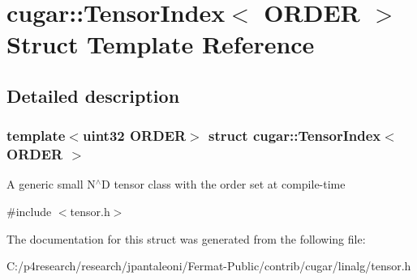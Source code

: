 \hypertarget{structcugar_1_1_tensor_index}{}\section{cugar\+:\+:Tensor\+Index$<$ O\+R\+D\+ER $>$ Struct Template Reference}
\label{structcugar_1_1_tensor_index}


\subsection{Detailed description}
\subsubsection*{template$<$uint32 O\+R\+D\+ER$>$\newline
struct cugar\+::\+Tensor\+Index$<$ O\+R\+D\+E\+R $>$}

A generic small N$^\wedge$D tensor class with the order set at compile-\/time 

{\ttfamily \#include $<$tensor.\+h$>$}



The documentation for this struct was generated from the following file\+:\begin{DoxyCompactItemize}
\item 
C\+:/p4research/research/jpantaleoni/\+Fermat-\/\+Public/contrib/cugar/linalg/tensor.\+h\end{DoxyCompactItemize}
